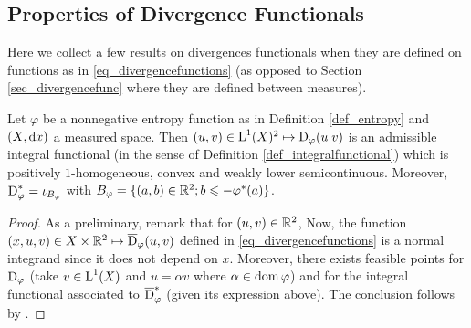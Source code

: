 \subsection{Properties of Divergence Functionals}
\label{sec:ApxDivergences}

Here we collect a few results on divergences functionals when they are defined on functions as in \eqref{eq_divergencefunctions} (as opposed to Section \ref{sec_divergencefunc} where they are defined between measures).
%
\begin{proposition}\label{prop_divergnormalint}
Let $\varphi$ be a nonnegative entropy function as in Definition \ref{def_entropy} and $(X,\mathrm{d} x)$ a measured space. Then $(u,v)\in \text{\upshape L}^1(X)^2 \mapsto \operatorname{D}_\varphi(u|v)$ is an admissible integral functional (in the sense of Definition \ref{def_integralfunctional}) which is positively $1$-homogeneous, convex and weakly lower semicontinuous. Moreover, $\operatorname{D}_\varphi^*= \iota_{B_\varphi}$ with $B_\varphi = \{(a,b)\in\mathbb{R}^2 ; b \leqslant -\varphi^*(a)\}$.
\end{proposition}
%
\begin{proof}
As a preliminary, remark that for $(u,v)\in \mathbb{R}^2$,
Now, the function $(x,u,v)\in X\times\mathbb{R}^2 \mapsto \overline{\operatorname{D}}_\varphi(u,v)$ defined in \eqref{eq_divergencefunctions} is a normal integrand since it does not depend on $x$. Moreover, there exists feasible points for $\operatorname{D}_\varphi$ (take $v\in \text{\upshape L}^1(X)$ and $u=\alpha v$ where $\alpha\in \operatorname{dom} \varphi$) and for the integral functional associated to $\overline{\operatorname{D}}^*_\varphi$ (given its expression above). The conclusion follows by \cite[Theorem 3C]{rockafellar1976integral}. %
\end{proof}
%
